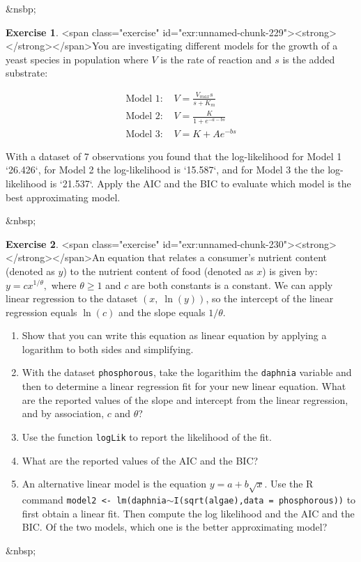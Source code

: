 \documentclass[
]{book}
\theoremstyle{definition}
\theoremstyle{definition}
\theoremstyle{definition}
\newtheorem{exercise}{Exercise}[chapter]
\theoremstyle{remark}
\begin{document}
&nsbp;

\begin{exercise}
<span class="exercise" id="exr:unnamed-chunk-229"><strong>\label{exr:unnamed-chunk-229} </strong></span>You are investigating different models for the growth of a yeast species in population where $V$ is the rate of reaction and $s$ is the added substrate:

\begin{equation*}
\begin{split}
\mbox{Model 1: } & V =  \frac{V_{max} s}{s+K_{m}} \\
\mbox{Model 2: } & V = \frac{K}{1+e^{-a-bs}} \\
\mbox{Model 3: } & V= K + Ae^{-bs}
\end{split}
\end{equation*}

With a dataset of 7 observations you found that the log-likelihood for Model 1 `26.426`, for Model 2 the log-likelihood is `15.587`, and for Model 3 the the log-likelihood is `21.537`.  Apply the AIC and the BIC to evaluate which model is the best approximating model.
\end{exercise}

&nbsp;
\begin{exercise}
<span class="exercise" id="exr:unnamed-chunk-230"><strong>\label{exr:unnamed-chunk-230} </strong></span>An equation that relates a consumer's nutrient content (denoted as $y$) to the nutrient content of food (denoted as $x$) is given by: $\displaystyle y = c x^{1/\theta},$ where $\theta \geq 1$ and $c$ are both constants is a constant.  We can apply linear regression to the dataset $(x, \; \ln(y) )$, so the intercept of the linear regression equals $\ln(c)$ and the slope equals $1 / \theta$.

\begin{enumerate}[label=\alph*.]
\item Show that you can write this equation as linear equation by applying a logarithm to both sides and simplifying.
\item With the dataset \texttt{phosphorous}, take the logarithim the \texttt{daphnia} variable and then to determine a linear regression fit for your new linear equation.  What are the reported values of the slope and intercept from the linear regression, and by association, $c$ and $\theta$?
\item Use the function \texttt{logLik} to report the likelihood of the fit.
\item What are the reported values of the AIC and the BIC?
\item An alternative linear model is the equation $y = a + b \sqrt{x}$.  Use the R command \texttt{model2 <- lm(daphnia}$\sim$\texttt{I(sqrt(algae),data = phosphorous))} to first obtain a linear fit.  Then compute the log likelihood and the AIC and the BIC.  Of the two models, which one is the better approximating model?
\end{enumerate}

\end{exercise}
&nbsp;
\end{document}
